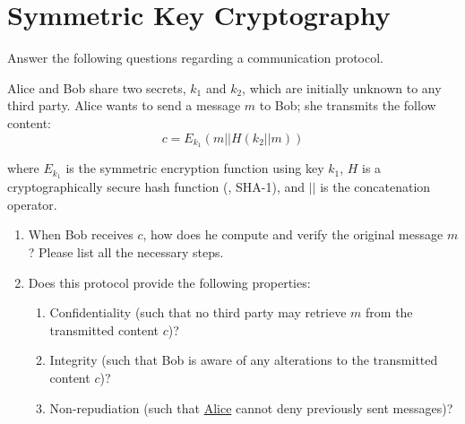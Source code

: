 \newpage
\section{Symmetric Key Cryptography}

Answer the following questions regarding a communication protocol.

Alice and Bob share two secrets, $k_1$ and $k_2$, which are initially
unknown to any third party. Alice wants to send a message $m$ to Bob;
she transmits the follow content:
$$c = E_{k_1} (m || H(k_2 || m) )$$

where $E_{k_1}$ is the symmetric encryption function using key $k_1$,
$H$ is a cryptographically secure hash function (\eg, SHA-1), and $||$ is
the concatenation operator.

\begin{enumerate}
    \item When Bob receives $c$, how does he compute and verify the original message $m$? Please list all the necessary steps.


     \item Does this protocol provide the following properties:
       \begin{enumerate}
         \item Confidentiality (such that no third party may retrieve $m$ from the transmitted content $c$)?
         \item Integrity (such that Bob is aware of any alterations to the transmitted content $c$)?
         \item Non-repudiation (such that \underline{Alice} cannot deny previously sent messages)?
         \end{enumerate}


\end{enumerate}
